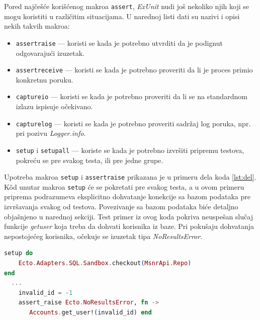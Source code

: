 \documentclass[12pt,oneside]{memoir}
\begin{document}
\par Pored najčešće korišćenog makroa \texttt{assert}, \emph{ExUnit} nudi još nekoliko njih koji se mogu koristiti u različitim situacijama. U narednoj listi dati su nazivi i opisi nekih takvih makroa:
 \begin{itemize}
 \item \texttt{assert{\textunderscore}raise} --- koristi se kada je potrebno utvrditi da je podignut odgovarajući izuzetak. 
 \item \texttt{assert{\textunderscore}receive} --- koristi se kada je potrebno proveriti da li je proces primio konkretnu poruku.
 \item \texttt{capture{\textunderscore}io} --- koristi se kada je potrebno proveriti da li se na standardnom izlazu ispisuje očekivano.
 \item \texttt{capture{\textunderscore}log} --- koristi se kada je potrebno proveriti sadržaj log poruka, npr. pri pozivu \emph{Logger.info}.
 \item \texttt{setup} i \texttt{setup{\textunderscore}all} --- koriste se kada je potrebno izvršiti pripremu testova, pokreću se pre svakog testa, ili pre jedne grupe.
 \end{itemize}
 
\par Upotreba makroa \texttt{setup} i \texttt{assert{\textunderscore}raise} prikazana je u primeru dela koda \ref{lst:del}. K\^{o}d  unutar makroa \texttt{setup} će se pokretati pre svakog testa, a u ovom primeru priprema podrazumeva eksplicitno dohvatanje konekcije sa bazom podataka pre izvršavanja svakog od testova. Povezivanje sa bazom podataka biće detaljno objašnjeno u narednoj sekciji. Test primer iz ovog koda pokriva neuspešan slučaj funkcije \emph{get{\textunderscore}user} koja treba da dohvati korisnika iz baze. Pri pokušaju dohvatanja nepostojećeg korisnika, očekuje se izuzetak tipa \emph{NoResultsError}. \\
 
 \begin{minipage}{\linewidth}
\begin{lstlisting}[language=elixir, basicstyle=\small, caption={Upotreba makroa \texttt{setup} i \texttt{assert{\textunderscore}raise} na primeru funkcije \emph{get{\textunderscore}user}},captionpos=b, label={lst:del}]
setup do
    Ecto.Adapters.SQL.Sandbox.checkout(MsnrApi.Repo)
end
  ...
    invalid_id = -1
    assert_raise Ecto.NoResultsError, fn ->
       Accounts.get_user!(invalid_id) end
  
\end{lstlisting}
\end{minipage}
\end{document}
